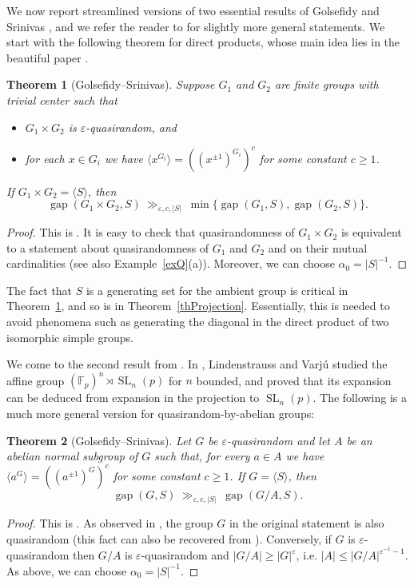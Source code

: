 \documentclass[11pt,reqno]{amsart}
\numberwithin{equation}{section}
\newtheorem{theorem}{Theorem}[section]
\theoremstyle{definition}
\theoremstyle{remark}
\newcommand{\SL}{\mathop{\mathrm{SL}}}
\newcommand{\gap}{\mathop{\mathrm{gap}}}
\begin{document}
We now report streamlined versions of two essential results of Golsefidy and Srinivas \cite{GS25},
and we refer the reader to \cite{GS25} for slightly more general statements.
We start with the following theorem for direct products,
whose main idea lies in the beautiful paper \cite{GS24}.

\begin{theorem}[Golsefidy--Srinivas] \label{thGSDirPro}
Suppose $G_1$ and $G_2$ are finite groups with trivial center such that
\begin{itemize}
\item $G_1 \times G_2$ is $\varepsilon$-quasirandom, and
\item for each $x \in G_i$ we have $\langle x^{G_i} \rangle = ((x^{\pm 1})^{G_i})^{c}$ for some constant $c \geq 1$.
\end{itemize}
If $G_1 \times G_2 = \langle S \rangle$, then
$$ \gap(G_1 \times G_2,S) \> \gg_{\varepsilon,c,|S|} \> \min \{ \gap(G_1,S) , \gap(G_2,S) \} . $$
\end{theorem}
\begin{proof}
This is \cite[Theorem~A]{GS25}.
It is easy to check that quasirandomness of $G_1 \times G_2$ is equivalent to
a statement about quasirandomness of $G_1$ and $G_2$ and on their mutual cardinalities
(see also Example~\ref{exQ}(a)).
Moreover, we can choose $\alpha_0 = |S|^{-1}$.
\end{proof}

The fact that $S$ is a generating set for the ambient group is critical in Theorem~\ref{thGSDirPro},
and so is in Theorem~\ref{thProjection}.
Essentially, this is needed to avoid phenomena such as
generating the diagonal in the direct product of two isomorphic simple groups.

We come to the second result from \cite{GS25}.
In \cite{LV16}, Lindenstrauss and Varj\'u studied the affine group
$(\mathbb{F}_p)^n \rtimes \SL_n(p)$ for $n$ bounded,
and proved that its expansion can be deduced from expansion in the projection to $\SL_n(p)$.
 The following is a much more general version for quasirandom-by-abelian groups:

\begin{theorem}[Golsefidy--Srinivas] \label{thGSAbe}
Let $G$ be $\varepsilon$-quasirandom and let $A$ be an abelian normal subgroup of $G$ such that,
for every $a \in A$ we have $\langle a^G \rangle = ((a^{\pm 1})^G)^{c}$ for some constant $c \geq 1$.
If $G = \langle S \rangle$, then
$$ \gap(G,S) \> \gg_{\varepsilon,c,|S|} \> \gap(G/A,S) . $$
\end{theorem}
\begin{proof}
This is \cite[Theorem~B]{GS25}.
As observed in \cite[Lemma~17]{GS25}, the group $G$ in the original statement is also quasirandom
(this fact can also be recovered from \cite[Lemma~4.1]{BS25}).
Conversely, if $G$ is $\varepsilon$-quasirandom then $G/A$ is $\varepsilon$-quasirandom
and $|G/A| \geq |G|^\varepsilon$, i.e. $|A| \leq |G/A|^{\varepsilon^{-1} -1}$.
As above, we can choose $\alpha_0 = |S|^{-1}$.
\end{proof}
\end{document}
